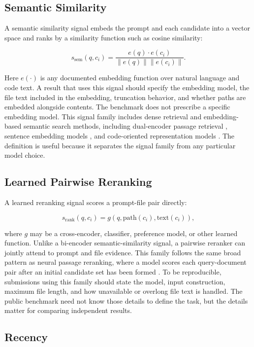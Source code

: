 \documentclass[11pt,a4paper]{article}
\begin{document}
\subsection{Semantic Similarity}

A semantic similarity signal embeds the prompt and each candidate into a vector
space and ranks by a similarity function such as cosine similarity:

\[
s_{\mathrm{sem}}(q, c_i) =
\frac{e(q) \cdot e(c_i)}{\|e(q)\| \|e(c_i)\|}.
\]

Here $e(\cdot)$ is any documented embedding function over natural language and
code text. A result that uses this signal should specify the embedding model,
the file text included in the embedding, truncation behavior, and whether paths
are embedded alongside contents. The benchmark does not prescribe a specific
embedding model. This signal family includes dense retrieval and embedding-based
semantic search methods, including dual-encoder passage retrieval
\cite{karpukhin2020dense}, sentence embedding models
\cite{reimers2019sentence}, and code-oriented representation models
\cite{feng2020codebert,guo2022unixcoder}. The definition is useful because it
separates the signal family from any particular model choice.

\subsection{Learned Pairwise Reranking}

A learned reranking signal scores a prompt-file pair directly:

\[
s_{\mathrm{rank}}(q, c_i) = g(q, \mathrm{path}(c_i), \mathrm{text}(c_i)),
\]

where $g$ may be a cross-encoder, classifier, preference model, or other learned
function. Unlike a bi-encoder semantic-similarity signal, a pairwise reranker can
jointly attend to prompt and file evidence. This family follows the same broad
pattern as neural passage reranking, where a model scores each query-document
pair after an initial candidate set has been formed \cite{nogueira2019passage}.
To be reproducible, submissions using this family should state the model, input
construction, maximum file length, and how unavailable or overlong file text is
handled. The public benchmark need not know those details to define the task,
but the details matter for comparing independent results.

\subsection{Recency}
\end{document}
